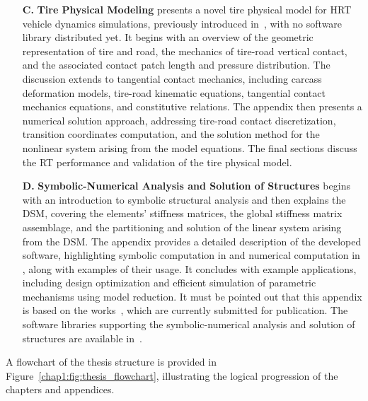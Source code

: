 \begin{enumerate}
  \item[\textbf{C.}] \textbf{Tire Physical Modeling} presents a novel tire physical model for \ac{HRT} vehicle dynamics simulations, previously introduced in~\cite{stocco2024physical}, with no software library distributed yet. It begins with an overview of the geometric representation of tire and road, the mechanics of tire-road vertical contact, and the associated contact patch length and pressure distribution. The discussion extends to tangential contact mechanics, including carcass deformation models, tire-road kinematic equations, tangential contact mechanics equations, and constitutive relations. The appendix then presents a numerical solution approach, addressing tire-road contact discretization, transition coordinates computation, and the solution method for the nonlinear system arising from the model equations. The final sections discuss the \ac{RT} performance and validation of the tire physical model.
  \item[\textbf{D.}] \textbf{Symbolic-Numerical Analysis and Solution of Structures} begins with an introduction to symbolic structural analysis and then explains the \ac{DSM}, covering the elements' stiffness matrices, the global stiffness matrix assemblage, and the partitioning and solution of the linear system arising from the \ac{DSM}. The appendix provides a detailed description of the developed software, highlighting symbolic computation in \Maple{} and numerical computation in \Matlab{}, along with examples of their usage. It concludes with example applications, including design optimization and efficient simulation of parametric mechanisms using model reduction. It must be pointed out that this appendix is based on the works~\cite{stocco2024trussme, larcher2024imece_symbolic}, which are currently submitted for publication. The software libraries supporting the symbolic-numerical analysis and solution of structures are available in~\cite{lem, last, trussme}.
\end{enumerate}
%
A flowchart of the thesis structure is provided in Figure~\ref{chap1:fig:thesis_flowchart}, illustrating the logical progression of the chapters and appendices.

